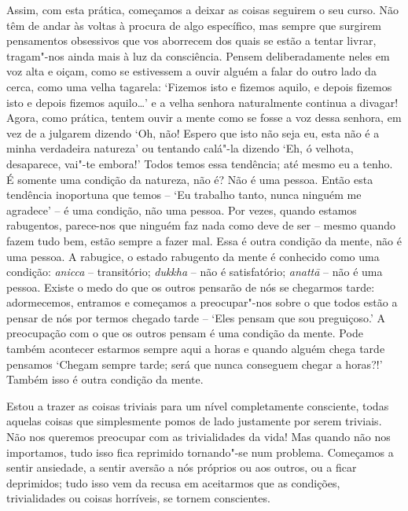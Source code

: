 Assim, com esta prática, começamos a deixar as coisas seguirem o seu
curso. Não têm de andar às voltas à procura de algo específico, mas
sempre que surgirem pensamentos obsessivos que vos aborrecem dos quais
se estão a tentar livrar, tragam"-nos ainda mais à luz da consciência.
Pensem \mbox{deliberadamente} neles em voz alta e oiçam, como se estivessem a
ouvir alguém a falar do outro lado da cerca, como uma velha tagarela:
`Fizemos isto e fizemos aquilo, e depois fizemos isto e depois fizemos
aquilo\ldots{}' e a velha senhora naturalmente continua a divagar!
Agora, como prática, tentem ouvir a mente como se fosse a voz dessa
senhora, em vez de a julgarem dizendo `Oh, não! Espero que isto não seja
eu, esta não é a minha verdadeira natureza' ou tentando calá"-la dizendo
`Eh, ó velhota, desaparece, vai"-te embora!' Todos temos essa tendência;
até mesmo eu a tenho. É somente uma condição da natureza, não é? Não é
uma pessoa. Então esta tendência inoportuna que temos -- `Eu trabalho
tanto, nunca ninguém me agradece' -- é uma condição, não uma pessoa. Por
vezes, quando estamos rabugentos, parece-nos que ninguém faz nada como 
deve de ser -- mesmo quando fazem tudo bem, estão sempre a fazer mal. 
Essa é outra condição da mente, não é uma pessoa.
A rabugice, o estado rabugento da mente é conhecido como
uma condição: \emph{anicca} -- transitório; \emph{dukkha} -- não é
satisfatório; \emph{anattā} -- não é uma pessoa. Existe o medo do que os
outros pensarão de nós se chegarmos tarde: adormecemos, entramos e
começamos a preocupar"-nos sobre o que todos estão a pensar de nós por
termos chegado tarde -- `Eles pensam que sou preguiçoso.' A preocupação
com o que os outros pensam é uma condição da mente. Pode também
acontecer estarmos sempre aqui a horas e quando alguém chega tarde
pensamos `Chegam sempre tarde; será que nunca conseguem chegar a
horas?!' Também isso é outra condição da mente.

Estou a trazer as coisas triviais para um nível completamente
consciente, todas aquelas coisas que simplesmente pomos de lado
justamente por serem triviais. Não nos queremos preocupar com as
trivialidades da vida! Mas quando não nos importamos, tudo isso fica
reprimido tornando"-se num problema. Começamos a sentir ansiedade, a
sentir aversão a nós próprios ou aos outros, ou a ficar deprimidos; tudo
isso vem da recusa em aceitarmos que as condições, trivialidades ou
coisas horríveis, se tornem conscientes.

